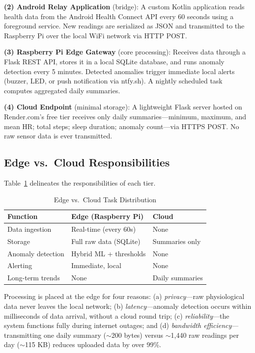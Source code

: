 \documentclass[conference]{IEEEtran}
\begin{document}
\textbf{(2) Android Relay Application} (bridge): A custom Kotlin application reads health data from the Android Health Connect API every 60 seconds using a foreground service. New readings are serialized as JSON and transmitted to the Raspberry Pi over the local WiFi network via HTTP POST.

\textbf{(3) Raspberry Pi Edge Gateway} (core processing): Receives data through a Flask REST API, stores it in a local SQLite database, and runs anomaly detection every 5 minutes. Detected anomalies trigger immediate local alerts (buzzer, LED, or push notification via ntfy.sh). A nightly scheduled task computes aggregated daily summaries.

\textbf{(4) Cloud Endpoint} (minimal storage): A lightweight Flask server hosted on Render.com's free tier receives only daily summaries---minimum, maximum, and mean HR; total steps; sleep duration; anomaly count---via HTTPS POST. No raw sensor data is ever transmitted.

\subsection{Edge vs.\ Cloud Responsibilities}

Table~\ref{tab:edge_cloud} delineates the responsibilities of each tier.

\begin{table}[htbp]
\caption{Edge vs.\ Cloud Task Distribution}
\label{tab:edge_cloud}
\centering
\footnotesize
\begin{tabularx}{\columnwidth}{lXX}
\toprule
\textbf{Function} & \textbf{Edge (Raspberry Pi)} & \textbf{Cloud} \\
\midrule
Data ingestion & Real-time (every 60s) & None \\
Storage & Full raw data (SQLite) & Summaries only \\
Anomaly detection & Hybrid ML + thresholds & None \\
Alerting & Immediate, local & None \\
Long-term trends & None & Daily summaries \\
\bottomrule
\end{tabularx}
\end{table}

Processing is placed at the edge for four reasons: (a) \textit{privacy}---raw physiological data never leaves the local network; (b) \textit{latency}---anomaly detection occurs within milliseconds of data arrival, without a cloud round trip; (c) \textit{reliability}---the system functions fully during internet outages; and (d) \textit{bandwidth efficiency}---transmitting one daily summary (\(\sim\)200 bytes) versus \(\sim\)1,440 raw readings per day (\(\sim\)115 KB) reduces uploaded data by over 99\%.
\end{document}
